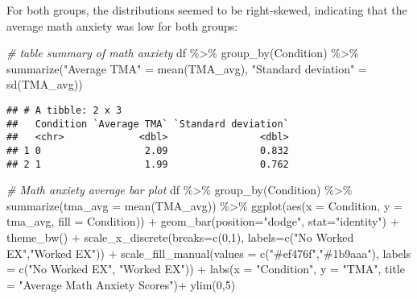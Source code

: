 \documentclass[
]{article}
\newenvironment{Shaded}{\begin{snugshade}}{\end{snugshade}}
\newcommand{\AttributeTok}[1]{\textcolor[rgb]{0.77,0.63,0.00}{#1}}
\newcommand{\CommentTok}[1]{\textcolor[rgb]{0.56,0.35,0.01}{\textit{#1}}}
\newcommand{\DecValTok}[1]{\textcolor[rgb]{0.00,0.00,0.81}{#1}}
\newcommand{\FunctionTok}[1]{\textcolor[rgb]{0.00,0.00,0.00}{#1}}
\newcommand{\NormalTok}[1]{#1}
\newcommand{\OtherTok}[1]{\textcolor[rgb]{0.56,0.35,0.01}{#1}}
\newcommand{\SpecialCharTok}[1]{\textcolor[rgb]{0.00,0.00,0.00}{#1}}
\newcommand{\StringTok}[1]{\textcolor[rgb]{0.31,0.60,0.02}{#1}}
\begin{document}
For both groups, the distributions seemed to be right-skewed, indicating
that the average math anxiety was low for both groups:

\begin{Shaded}
\begin{Highlighting}[]
\CommentTok{\# table summary of math anxiety}
\NormalTok{df }\SpecialCharTok{\%\textgreater{}\%} 
  \FunctionTok{group\_by}\NormalTok{(Condition) }\SpecialCharTok{\%\textgreater{}\%} 
  \FunctionTok{summarize}\NormalTok{(}\StringTok{"Average TMA"} \OtherTok{=} \FunctionTok{mean}\NormalTok{(TMA\_avg), }\StringTok{"Standard deviation"} \OtherTok{=} \FunctionTok{sd}\NormalTok{(TMA\_avg))}
\end{Highlighting}
\end{Shaded}

\begin{verbatim}
## # A tibble: 2 x 3
##   Condition `Average TMA` `Standard deviation`
##   <chr>             <dbl>                <dbl>
## 1 0                  2.09                0.832
## 2 1                  1.99                0.762
\end{verbatim}

\begin{Shaded}
\begin{Highlighting}[]
\CommentTok{\# Math anxiety average bar plot}
\NormalTok{df }\SpecialCharTok{\%\textgreater{}\%} 
  \FunctionTok{group\_by}\NormalTok{(Condition) }\SpecialCharTok{\%\textgreater{}\%} 
  \FunctionTok{summarize}\NormalTok{(}\AttributeTok{tma\_avg =} \FunctionTok{mean}\NormalTok{(TMA\_avg))  }\SpecialCharTok{\%\textgreater{}\%} 
  \FunctionTok{ggplot}\NormalTok{(}\FunctionTok{aes}\NormalTok{(}\AttributeTok{x =}\NormalTok{ Condition, }\AttributeTok{y =}\NormalTok{ tma\_avg, }\AttributeTok{fill =}\NormalTok{ Condition)) }\SpecialCharTok{+}
  \FunctionTok{geom\_bar}\NormalTok{(}\AttributeTok{position=}\StringTok{"dodge"}\NormalTok{, }\AttributeTok{stat=}\StringTok{"identity"}\NormalTok{) }\SpecialCharTok{+} \FunctionTok{theme\_bw}\NormalTok{() }\SpecialCharTok{+} 
  \FunctionTok{scale\_x\_discrete}\NormalTok{(}\AttributeTok{breaks=}\FunctionTok{c}\NormalTok{(}\DecValTok{0}\NormalTok{,}\DecValTok{1}\NormalTok{),}
        \AttributeTok{labels=}\FunctionTok{c}\NormalTok{(}\StringTok{"No Worked EX"}\NormalTok{,}\StringTok{"Worked EX"}\NormalTok{)) }\SpecialCharTok{+}
  \FunctionTok{scale\_fill\_manual}\NormalTok{(}\AttributeTok{values =} \FunctionTok{c}\NormalTok{(}\StringTok{"\#ef476f"}\NormalTok{,}\StringTok{"\#1b9aaa"}\NormalTok{), }\AttributeTok{labels =} 
                                  \FunctionTok{c}\NormalTok{(}\StringTok{"No Worked EX"}\NormalTok{, }\StringTok{"Worked EX"}\NormalTok{)) }\SpecialCharTok{+}
  \FunctionTok{labs}\NormalTok{(}\AttributeTok{x =} \StringTok{"Condition"}\NormalTok{, }\AttributeTok{y =} \StringTok{"TMA"}\NormalTok{, }\AttributeTok{title =} \StringTok{"Average Math Anxiety Scores"}\NormalTok{)}\SpecialCharTok{+} \FunctionTok{ylim}\NormalTok{(}\DecValTok{0}\NormalTok{,}\DecValTok{5}\NormalTok{)}
\end{Highlighting}
\end{Shaded}
\end{document}
